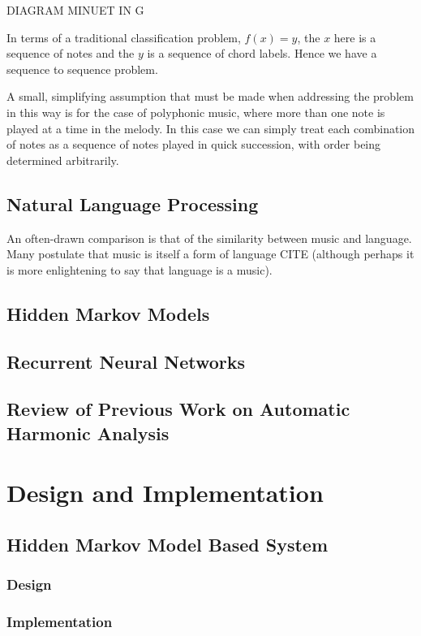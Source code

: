 \documentclass[bsc,singlespacing,logo, parskip, deptreport]{infthesis}
\begin{document}
DIAGRAM MINUET IN G

In terms of a traditional classification problem, $f(x) = y$, the $x$ here is a sequence of notes and the $y$ is a sequence of chord labels. Hence we have a sequence to sequence problem.

A small, simplifying assumption that must be made when addressing the problem in this way is for the case of polyphonic music, where more than one note is played at a time in the melody. In this case we can simply treat each combination of notes as a sequence of notes played in quick succession, with order being determined arbitrarily.

\section{Natural Language Processing}

An often-drawn comparison is that of the similarity between music and language. Many postulate that music is itself a form of language CITE (although perhaps it is more enlightening to say that language is a music). 

\section{Hidden Markov Models}

\section{Recurrent Neural Networks}

\section{Review of Previous Work on Automatic Harmonic Analysis}


\chapter{Design and Implementation}

\section{Hidden Markov Model Based System}
\subsection{Design}
\subsection{Implementation}
\end{document}
